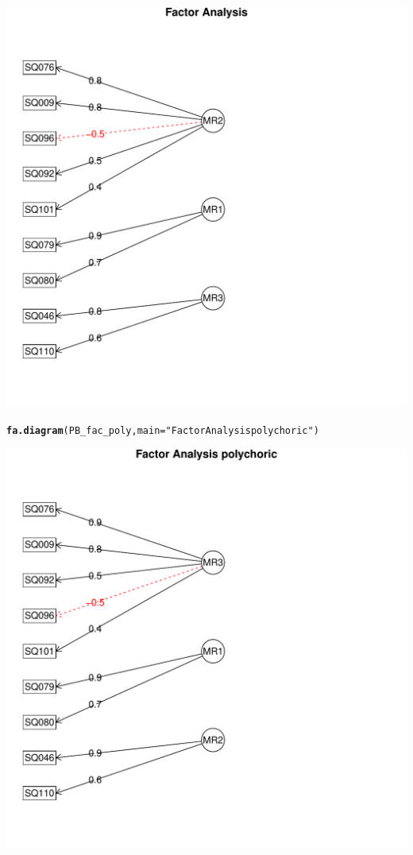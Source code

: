 \documentclass{article}\usepackage[]{graphicx}\usepackage[]{color}
\makeatletter
\def\maxwidth{ %
  \ifdim\Gin@nat@width>\linewidth
    \linewidth
  \else
    \Gin@nat@width
  \fi
}
\newcommand{\hlstr}[1]{\textcolor[rgb]{0.192,0.494,0.8}{#1}}%
\newcommand{\hlstd}[1]{\textcolor[rgb]{0.345,0.345,0.345}{#1}}%
\newcommand{\hlkwc}[1]{\textcolor[rgb]{0.333,0.667,0.333}{#1}}%
\newcommand{\hlkwd}[1]{\textcolor[rgb]{0.737,0.353,0.396}{\textbf{#1}}}%
\newenvironment{kframe}{%
 \def\at@end@of@kframe{}%
 \ifinner\ifhmode%
  \def\at@end@of@kframe{\end{minipage}}%
  \begin{minipage}{\columnwidth}%
 \fi\fi%
 \def\FrameCommand##1{\hskip\@totalleftmargin \hskip-\fboxsep
 \colorbox{shadecolor}{##1}\hskip-\fboxsep
     \hskip-\linewidth \hskip-\@totalleftmargin \hskip\columnwidth}%
 \MakeFramed {\advance\hsize-\width
   \@totalleftmargin\z@ \linewidth\hsize
   \@setminipage}}%
 {\par\unskip\endMakeFramed%
 \at@end@of@kframe}
\newenvironment{knitrout}{}{} %
\makeatother
\begin{document}
\begin{knitrout}
\begin{kframe}
\begin{alltt}
\end{alltt}
\end{kframe}
\includegraphics[width=\maxwidth]{figure/psych3} 
\begin{kframe}\begin{alltt}
\hlkwd{fa.diagram}\hlstd{(PB_fac_poly,} \hlkwc{main} \hlstd{=}\hlstr{"Factor Analysis polychoric"}\hlstd{)}
\end{alltt}
\end{kframe}
\includegraphics[width=\maxwidth]{figure/psych4} 

\end{knitrout}
\end{document}
